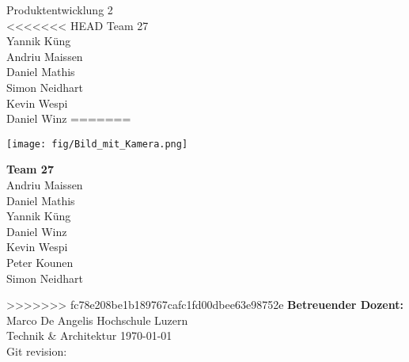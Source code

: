    \begin{titlepage}
        \begin{center}
            \makeatletter
            {\Large Produktentwicklung 2} \\
            \vfill{}
            {\LARGE \@title}
            \vfill{}
<<<<<<< HEAD
            {Team 27 \\
            Yannik Küng \\
            Andriu Maissen \\
            Daniel Mathis \\
            Simon Neidhart \\
            Kevin Wespi \\
            Daniel Winz}
=======
            \begin{minipage}{0.60\textwidth}
                \texttt{[image: fig/Bild\_mit\_Kamera.png]}
            \end{minipage}
            \begin{minipage}{0.16\textwidth}
                {\textbf{Team 27} \\
                Andriu Maissen \\
                Daniel Mathis \\
                Yannik Küng \\
                Daniel Winz \\
                Kevin Wespi \\
                Peter Kounen \\
                Simon Neidhart}
            \end{minipage}
>>>>>>> fc78e208be1b189767cafc1fd00dbee63e98752e
            \vfill{}
            {\textbf{Betreuender Dozent:} \\
            Marco De Angelis}
            \vfill{}
            {Hochschule Luzern \\
            Technik \& Architektur}
            \vfill
            {\today \\
            Git revision: 
            }
            \makeatother
        \end{center}
    \end{titlepage}
